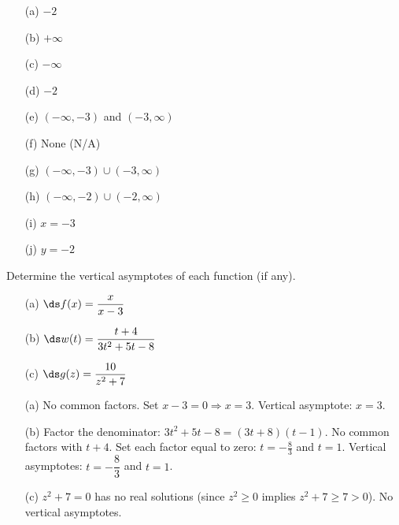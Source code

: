 \documentclass{ximera}
\begin{document}
\begin{problem}
\begin{solution}
\begin{enumerate}
  \item[(a)] $-2$
  \item[(b)] $+\infty$
  \item[(c)] $-\infty$
  \item[(d)] $-2$
  \item[(e)] $(-\infty,-3)$ and $(-3,\infty)$
  \item[(f)] None (N/A)
  \item[(g)] $(-\infty,-3)\cup(-3,\infty)$
  \item[(h)] $(-\infty,-2)\cup(-2,\infty)$
  \item[(i)] $x=-3$
  \item[(j)] $y=-2$
\end{enumerate}
\end{solution}
\end{problem}


\begin{problem}
Determine the vertical asymptotes of each function (if any).
\begin{enumerate}
  \item[(a)] $\ds f(x) = \dfrac{x}{x-3}$
  \medskip
  \item[(b)] $\ds w(t) = \dfrac{t+4}{3t^2+5t-8}$
  \medskip
  \item[(c)] $\ds g(z) = \dfrac{10}{z^2+7}$
\end{enumerate}

\begin{solution}
\begin{enumerate}
  \item[(a)] No common factors. Set $x-3=0 \Rightarrow x=3$. Vertical asymptote: $x=3$.

  \item[(b)] Factor the denominator: $3t^2+5t-8 = (3t+8)(t-1)$. No common factors with $t+4$. Set each factor equal to zero: $t=-\tfrac{8}{3}$ and $t=1$. Vertical asymptotes: $t=-\dfrac{8}{3}$ and $t=1$.

  \item[(c)] $z^2+7=0$ has no real solutions (since $z^2 \geq 0$ implies $z^2+7 \geq 7 > 0$). No vertical asymptotes.
\end{enumerate}
\end{solution}
\end{problem}
\end{document}
